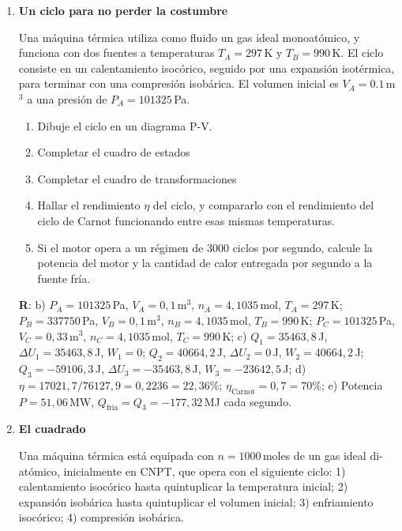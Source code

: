 \documentclass[a4paper,12pt]{article}
\begin{document}
\begin{enumerate}
	\item {\bf{Un ciclo para no perder la costumbre}}
		
		Una máquina térmica utiliza como fluido un gas ideal monoatómico, y
		funciona con dos fuentes a temperaturas $T_A = 297$\,K y $T_B =
		990$\,K. El ciclo consiste en un calentamiento isocórico, seguido por
		una expansión isotérmica, para terminar con una compresión isobárica.
		El volumen inicial es $V_A=0.1$\,m$^3$ a una presión de
		$P_A=101325$\,Pa.
		
		\begin{enumerate}
			\item Dibuje el ciclo en un diagrama P-V.
			\item Completar el cuadro de estados 
			\item Completar el cuadro de transformaciones
			\item Hallar el rendimiento $\eta$ del ciclo, y compararlo con el
				rendimiento del ciclo de Carnot funcionando entre esas mismas
				temperaturas.
			\item Si el motor opera a un régimen de $3000$ ciclos por segundo,
				calcule la potencia del motor y la cantidad de calor entregada
				por segundo a la fuente fría.
		\end{enumerate}
		{\bf{R}}: b) $P_A=101325$\,Pa, $V_A=0,1$\,m$^3$, $n_A=4,1035$\,mol,
		$T_A=297$\,K; $P_B=337750$\,Pa, $V_B=0,1$\,m$^3$, $n_B=4,1035$\,mol,
		$T_B=990$\,K; $P_C=101325$\,Pa, $V_C=0,33$\,m$^3$, $n_C=4,1035$\,mol,
		$T_C=990$\,K; c) $Q_1=35463,8$\,J, $\Delta U_1=35463,8$\,J, $W_1=0$;
		$Q_2=40664,2$\,J, $\Delta U_2=0$\,J, $W_2=40664,2$\,J;
		$Q_3=-59106,3$\,J, $\Delta U_3=-35463,8$\,J, $W_3=-23642,5$\,J; d)
		$\eta=17021,7/76127,9 = 0,2236 = 22,36\%$; $\eta_{\mathrm{Carnot}} =
		0,7 = 70\%$; e) Potencia $P=51,06$\,MW,
		$Q_{\mathrm{fria}}=Q_3=-177,32$\,MJ cada segundo.
	
	\item {\bf{El cuadrado}}
		
		Una máquina térmica está equipada con $n=1000$\,moles de un gas ideal
		di-atómico, inicialmente en CNPT, que opera con el siguiente ciclo: 1)
		calentamiento isocórico hasta quintuplicar la temperatura inicial; 2)
		expansión isobárica hasta quintuplicar el volumen inicial; 3)
		enfriamiento isocórico; 4) compresión isobárica.
		

\end{enumerate}
\end{document}
